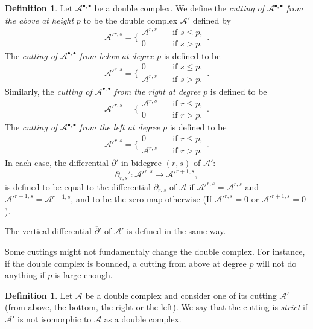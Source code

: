 \documentclass[leqno]{article}
\theoremstyle{definition}
\newtheorem{Definition}[equation]{Definition}
\numberwithin{equation}{section}
\begin{document}
\begin{Definition}
Let $\mathcal{A}^{\bullet, \bullet}$ be a double complex. We define the {\sl cutting of } $\mathcal{A}^{\bullet, \bullet}$ {\sl from the above at height} $p$ to be the double complex $\mathcal{A}'$ defined by
\[
\mathcal{A}'^{r, s}
=
\Bigg\{
\begin{array}{ccc}
\mathcal{A}^{r, s} \quad &\text{if } s \leqslant p, \\
0 \quad &\text{if } s > p.
\end{array}.
\]
The {\sl cutting of  }$\mathcal{A}^{\bullet, \bullet}$ {\sl from below at degree} $p$ is defined to be
\[
\mathcal{A}'^{r, s}
=
\Bigg\{
\begin{array}{ccc}
0 \quad &\text{if } s \leqslant p, \\
\mathcal{A}^{r, s} \quad &\text{if } s > p.
\end{array}.
\]
Similarly, the {\sl cutting of }$\mathcal{A}^{\bullet, \bullet}$ {\sl from the right at degree} $p$ is defined to be
\[
\mathcal{A}'^{r, s}
=
\Bigg\{
\begin{array}{ccc}
\mathcal{A}^{r, s} \quad &\text{if } r \leqslant p, \\
0 \quad &\text{if } r > p.
\end{array}.
\]
The {\sl cutting of  }$\mathcal{A}^{\bullet, \bullet}$ {\sl from the left at degree} $p$ is defined to be
\[
\mathcal{A}'^{r, s}
=
\Bigg\{
\begin{array}{ccc}
0 \quad &\text{if } r \leqslant p, \\
\mathcal{A}^{r, s} \quad &\text{if } r > p.
\end{array}.
\]
In each case, the differential $\partial'$ in bidegree $(r, s)$ of $\mathcal{A}'$:
\[
\partial_{r, s}'
:
\mathcal{A}'^{r, s} \longrightarrow \mathcal{A}'^{r+1, s},
\]
is defined to be equal to the differential $\partial_{r, s}$ of $\mathcal{A}$ if $\mathcal{A}'^{r, s} = \mathcal{A}^{r, s}$ and $\mathcal{A}'^{r+1, s} = \mathcal{A}^{r+1, s}$, and to be the zero map otherwise (If  $\mathcal{A}'^{r, s} = 0$ or $\mathcal{A}'^{r+1, s} = 0$). 

The vertical differential $\overline{\partial}'$ of $\mathcal{A}'$ is defined in the same way.
\end{Definition}
Some cuttings might not fundamentaly change the double complex. For instance, if the double complex is bounded, a cutting from above at degree $p$ will not do anything if $p$ is large enough. 
\begin{Definition}
Let $\mathcal{A}$ be a double complex and consider one of its cutting $\mathcal{A}'$ (from above, the bottom, the right or the left). We say that the cutting is {\sl strict} if $\mathcal{A}'$ is not isomorphic to $\mathcal{A}$ as a double complex.
\end{Definition}
\end{document}
